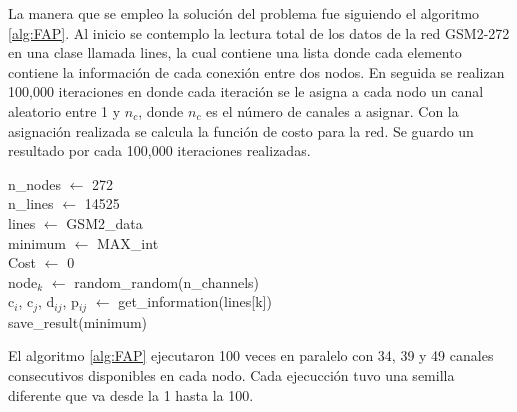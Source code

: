 La manera que se empleo la solución del problema fue siguiendo el algoritmo \ref{alg:FAP}. Al inicio se contemplo la lectura total de los datos de la red GSM2-272 en una clase llamada lines, la cual contiene una lista donde cada elemento contiene la información de cada conexión entre dos nodos. En seguida se realizan 100,000 iteraciones en donde cada iteración se le asigna a cada nodo un canal aleatorio entre 1 y $n_c$, donde $n_c$ es el número de canales a asignar. Con la asignación realizada se calcula la función de costo para la red. Se guardo un resultado por cada 100,000 iteraciones realizadas.

\begin{algorithm}[H]
    \caption{}
    \label{alg:FAP}
    n\_nodes $\gets$ 272\\
    n\_lines $\gets$ 14525\\
    lines $\gets$ GSM2\_data\\
    minimum $\gets$ MAX\_int\\
    {
        Cost $\gets$  0\\
        {
            node$_k$ $\gets$ random\_random(n\_channels)\\
        }
        {
            c$_i$, c$_j$, d$_{ij}$, p$_{ij}$ $\gets$ get\_information(lines[k])\\
        }
    }
    save\_result(minimum)\\
\end{algorithm}

El algoritmo \ref{alg:FAP} ejecutaron 100 veces en paralelo con 34, 39 y 49 canales consecutivos disponibles en cada nodo. Cada ejecucción tuvo una semilla diferente que va desde la 1 hasta la 100.